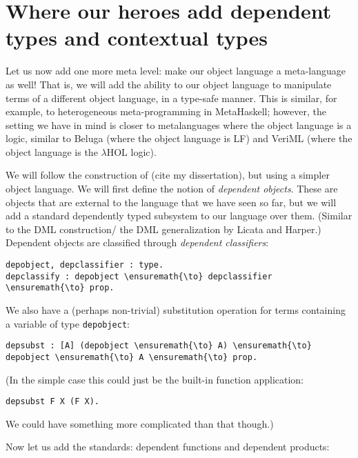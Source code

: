 \section{Where our heroes add dependent types and contextual
types}\label{where-our-heroes-add-dependent-types-and-contextual-types}

Let us now add one more meta level: make our object language a
meta-language as well! That is, we will add the ability to our object
language to manipulate terms of a different object language, in a
type-safe manner. This is similar, for example, to heterogeneous
meta-programming in MetaHaskell; however, the setting we have in mind is
closer to metalanguages where the object language is a logic, similar to
Beluga (where the object language is LF) and VeriML (where the object
language is the \(\lambda\text{HOL}\) logic).

We will follow the construction of (cite my dissertation), but using a
simpler object language. We will first define the notion of
\emph{dependent objects}. These are objects that are external to the
language that we have seen so far, but we will add a standard
dependently typed subsystem to our language over them. (Similar to the
DML construction/ the DML generalization by Licata and Harper.)
Dependent objects are classified through \emph{dependent classifiers}:

\begin{verbatim}
depobject, depclassifier : type.
depclassify : depobject \ensuremath{\to} depclassifier \ensuremath{\to} prop.
\end{verbatim}

We also have a (perhaps non-trivial) substitution operation for terms
containing a variable of type \texttt{depobject}:

\begin{verbatim}
depsubst : [A] (depobject \ensuremath{\to} A) \ensuremath{\to} depobject \ensuremath{\to} A \ensuremath{\to} prop.
\end{verbatim}

(In the simple case this could just be the built-in function
application:

\begin{verbatim}
depsubst F X (F X).
\end{verbatim}

We could have something more complicated than that though.)

Now let us add the standards: dependent functions and dependent
products:

